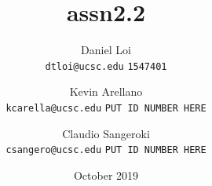 \documentclass[12pt]{article}
\title{assn2.2}
\author{
  Daniel Loi\\
  \texttt{dtloi@ucsc.edu}
  \texttt{1547401}
  \and
  Kevin Arellano\\
  \texttt{kcarella@ucsc.edu}
  \texttt{PUT ID NUMBER HERE}
  \and
  Claudio Sangeroki\\
  \texttt{csangero@ucsc.edu}
  \texttt{PUT ID NUMBER HERE}
}
\date{October 2019}
\begin{document}
\maketitle

\begin{enumerate}
    
    
    
\end{enumerate}
    
\end{document}

